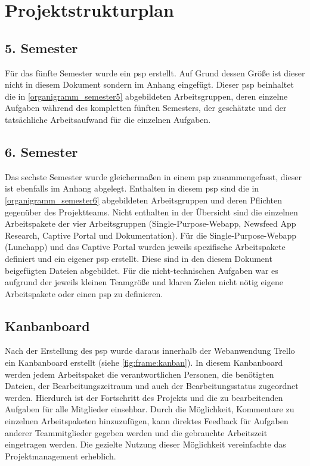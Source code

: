 \section{Projektstrukturplan}

\subsection{5. Semester}

Für das fünfte Semester wurde ein \gls{psp} erstellt. Auf Grund dessen Größe ist dieser nicht in diesem Dokument sondern im Anhang eingefügt. Dieser \gls{psp} beinhaltet die in \vref{organigramm_semester5} abgebildeten Arbeitsgruppen, deren einzelne Aufgaben während des kompletten fünften Semesters, der geschätzte und der tatsächliche Arbeitsaufwand für die einzelnen Aufgaben.

\subsection{6. Semester}

Das sechste Semester wurde gleichermaßen in einem \gls{psp} zusammengefasst, dieser ist ebenfalls im Anhang abgelegt. Enthalten in diesem \gls{psp} sind die in \vref{organigramm_semester6} abgebildeten Arbeitsgruppen und deren Pflichten gegenüber des Projektteams. Nicht enthalten in der Übersicht sind die einzelnen Arbeitspakete der vier Arbeitsgruppen (Single-Purpose-Webapp, Newsfeed App Research, Captive Portal und Dokumentation). Für die Single-Purpose-Webapp (Lunchapp) und das Captive Portal wurden jeweils spezifische Arbeitspakete definiert und ein eigener \gls{psp} erstellt. Diese sind in den diesem Dokument beigefügten Dateien abgebildet. Für die nicht-technischen Aufgaben war es aufgrund der jeweils kleinen Teamgröße und klaren Zielen nicht nötig eigene Arbeitspakete oder einen \gls{psp} zu definieren. 

\subsection{Kanbanboard}

Nach der Erstellung des \gls{psp} wurde daraus innerhalb der Webanwendung Trello ein Kanbanboard erstellt (siehe \ref{fig:frame:kanban}). In diesem Kanbanboard werden jedem Arbeitspaket die verantwortlichen Personen, die benötigten Dateien, der Bearbeitungszeitraum und auch der Bearbeitungsstatus zugeordnet werden. Hierdurch ist der Fortschritt des Projekts und die zu bearbeitenden Aufgaben für alle Mitglieder einsehbar. Durch die Möglichkeit, Kommentare zu einzelnen Arbeitspaketen hinzuzufügen, kann direktes Feedback für Aufgaben anderer Teammitglieder gegeben werden und die gebrauchte Arbeitszeit eingetragen werden. Die gezielte Nutzung dieser Möglichkeit vereinfachte das Projektmanagement erheblich.

